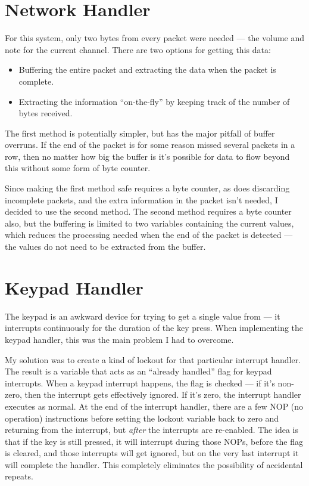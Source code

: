 \section{Network Handler}
\label{sec:design:network}

For this system, only two bytes from every packet were needed --- the volume and note for the 
current channel.  There are two options for getting this data:

\begin{itemize}
\item Buffering the entire packet and extracting the data when the packet is complete.
\item Extracting the information ``on-the-fly'' by keeping track of the number of bytes received.
\end{itemize}

The first method is potentially simpler, but has the major pitfall of buffer overruns.  If the end 
of the packet is for some reason missed several packets in a row, then no matter how big the buffer 
is it's possible for data to flow beyond this without some form of byte counter.

Since making the first method safe requires a byte counter, as does discarding incomplete packets, 
and the extra information in the packet isn't needed, I decided to use the second method.  The 
second method requires a byte counter also, but the buffering is limited to two variables containing 
the current values, which reduces the processing needed when the end of the packet is detected --- 
the values do not need to be extracted from the buffer.


\section{Keypad Handler}
\label{sec:design:keypad}

The keypad is an awkward device for trying to get a single value from --- it interrupts continuously 
for the duration of the key press.  When implementing the keypad handler, this was the main problem 
I had to overcome.

My solution was to create a kind of lockout for that particular interrupt handler.  The result is a 
variable that acts as an ``already handled'' flag for keypad interrupts.  When a keypad interrupt 
happens, the flag is checked --- if it's non-zero, then the interrupt gets effectively ignored.  If 
it's zero, the interrupt handler executes as normal.  At the end of the interrupt handler, there are 
a few NOP (no operation) instructions before setting the lockout variable back to zero and returning 
from the interrupt, but \emph{after} the interrupts are re-enabled.  The idea is that if the key is 
still pressed, it will interrupt during those NOPs, before the flag is cleared, and those interrupts 
will get ignored, but on the very last interrupt it will complete the handler.  This completely 
eliminates the possibility of accidental repeats.

